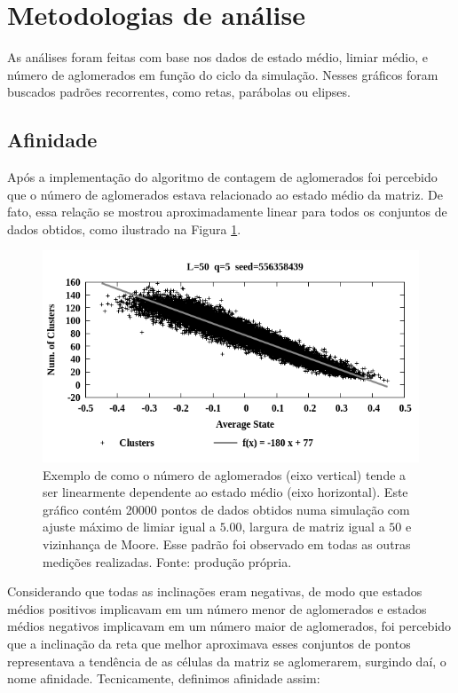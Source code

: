 \documentclass[
	12pt,				%
	openright,			%
	twoside,			%
	a4paper,			%
	english,			%
	french,				%
	spanish,			%
	brazil				%
	]{abntex2}
\begin{document}
\section{Metodologias de análise}

As análises foram feitas com base nos dados de estado médio, limiar médio, e número de aglomerados em função do ciclo da simulação. Nesses gráficos foram buscados padrões recorrentes, como retas, parábolas ou elipses.

\subsection{Afinidade}

Após a implementação do algoritmo de contagem de aglomerados foi percebido que o número de aglomerados estava relacionado ao estado médio da matriz. De fato, essa relação se mostrou aproximadamente linear para todos os conjuntos de dados obtidos, como ilustrado na Figura \ref{fig:exemploAfinidade}. 
\begin{figure}[h]
    \centering
    \includegraphics[width=.75\linewidth]{ICA-L50-q5_0-seed556358439-ClusterVsAvgState.png}
    \caption{Exemplo de como o número de aglomerados (eixo vertical) tende a ser linearmente dependente ao estado médio (eixo horizontal). Este gráfico contém 20000 pontos de dados obtidos numa simulação com ajuste máximo de limiar igual a $5.00$, largura de matriz igual a $50$ e vizinhança de Moore. Esse padrão foi observado em todas as outras medições realizadas. Fonte: produção própria.}
    \label{fig:exemploAfinidade}
\end{figure}
Considerando que todas as inclinações eram negativas, de modo que estados médios positivos implicavam em um número menor de aglomerados e estados médios negativos implicavam em um número maior de aglomerados, foi percebido que a inclinação da reta que melhor aproximava esses conjuntos de pontos representava a tendência de as células da matriz se aglomerarem, surgindo daí, o nome afinidade. Tecnicamente, definimos afinidade assim:
\end{document}
